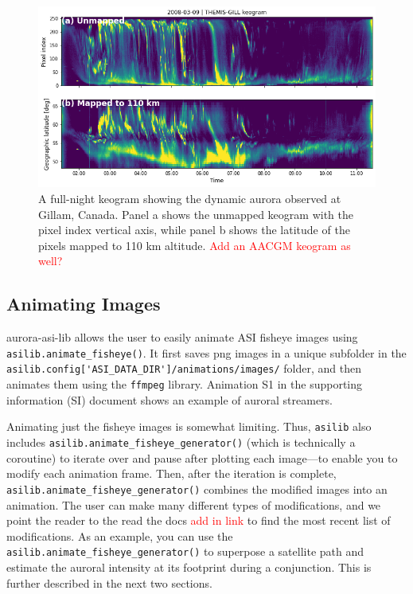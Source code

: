 \documentclass[utf8]{FrontiersinHarvard} %
\begin{document}
\begin{figure}
      \includegraphics[width=\textwidth]{figures/fig3.png}
      \caption{A full-night keogram showing the dynamic aurora observed at Gillam, Canada. Panel a shows the unmapped keogram with the pixel index vertical axis, while panel b shows the latitude of the pixels mapped to 110 km altitude. \textcolor{red}{Add an AACGM keogram as well?}}
      \label{fig3}
\end{figure}


\subsection{Animating Images}
aurora-asi-lib allows the user to easily animate ASI fisheye images using \verb|asilib.animate_fisheye()|. It first saves png images in a unique subfolder in the \verb|asilib.config['ASI_DATA_DIR']/animations/images/| folder, and then animates them using the \verb|ffmpeg| \cite{ffmpeg} library. Animation S1 in the supporting information (SI) document shows an example of auroral streamers.

Animating just the fisheye images is somewhat limiting. Thus, \verb|asilib| also includes \verb|asilib.animate_fisheye_generator()| (which is technically a coroutine) to iterate over and pause after plotting each image---to enable you to modify each animation frame. Then, after the iteration is complete, \verb|asilib.animate_fisheye_generator()| combines the modified images into an animation. The user can make many different types of modifications, and we point the reader to the read the docs \textcolor{red}{add in link} to find the most recent list of modifications. As an example, you can use the  \verb|asilib.animate_fisheye_generator()| to superpose a satellite path and estimate the auroral intensity at its footprint during a conjunction. This is further described in the next two sections.
\end{document}
